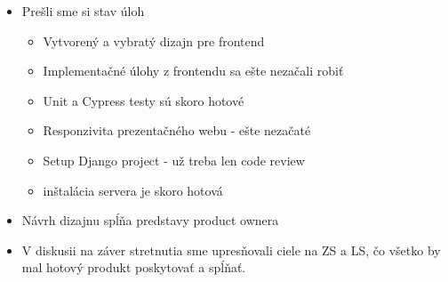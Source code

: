\documentclass{article}
\begin{document}
    \begin{itemize}
        \item Prešli sme si stav úloh
        \begin{itemize}
            \item Vytvorený a vybratý dizajn pre frontend
            \item Implementačné úlohy z frontendu sa ešte nezačali robiť
            \item Unit a Cypress testy sú skoro hotové
            \item Responzivita prezentačného webu - ešte nezačaté
            \item Setup Django project - už treba len code review
            \item inštalácia servera je skoro hotová
        \end{itemize}
        \item Návrh dizajnu spĺňa predstavy product ownera
        \item V diskusii na záver stretnutia sme upresňovali ciele na ZS a LS, čo všetko by mal hotový produkt poskytovať a spĺňať.
    \end{itemize}
\end{document}
